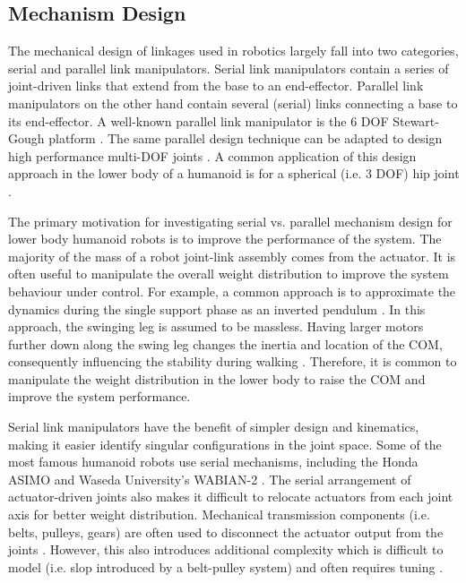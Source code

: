 

\subsection{Mechanism Design} %
\label{sub:related_mechanism_design}
The mechanical design of linkages used in robotics largely fall into two categories, serial and parallel link manipulators. Serial link manipulators contain a series of joint-driven links that extend from the base to an end-effector. Parallel link manipulators on the other hand contain several (serial) links connecting a base to its end-effector. A well-known parallel link manipulator is the 6 DOF Stewart-Gough platform \cite{Dasgupta2000,Sugahara2005}. The same parallel design technique can be adapted to design high performance multi-DOF joints \cite{Gosselin1994}. A common application of this design approach in the lower body of a humanoid is for a spherical (i.e. 3 DOF) hip joint \cite{Hofschulte2005}. 

The primary motivation for investigating serial vs. parallel mechanism design for lower body humanoid robots is to improve the performance of the system. The majority of the mass of a robot joint-link assembly comes from the actuator. It is often useful to manipulate the overall weight distribution to improve the system behaviour under control. For example, a common approach is to approximate the dynamics during the single support phase as an inverted pendulum \cite{Kajita1992}. In this approach, the swinging leg is assumed to be massless. Having larger motors further down along the swing leg changes the inertia and location of the COM, consequently influencing the stability during walking \cite{Morisawa2000}. Therefore, it is common to manipulate the weight distribution in the lower body to raise the COM and improve the system performance. 

Serial link manipulators have the benefit of simpler design and kinematics, making it easier identify singular configurations in the joint space. Some of the most famous humanoid robots use serial mechanisms, including the Honda ASIMO \cite{Sakagami:2002cf} and Waseda University's WABIAN-2 \cite{Ogura:2006bm}. The serial arrangement of actuator-driven joints also makes it difficult to relocate actuators from each joint axis for better weight distribution. Mechanical transmission components (i.e. belts, pulleys, gears) are often used to disconnect the actuator output from the joints \cite{Ogura:2006bm}. However, this also introduces additional complexity which is difficult to model (i.e. slop introduced by a belt-pulley system) and often requires tuning \cite{IllWooPark:2005et}. 

